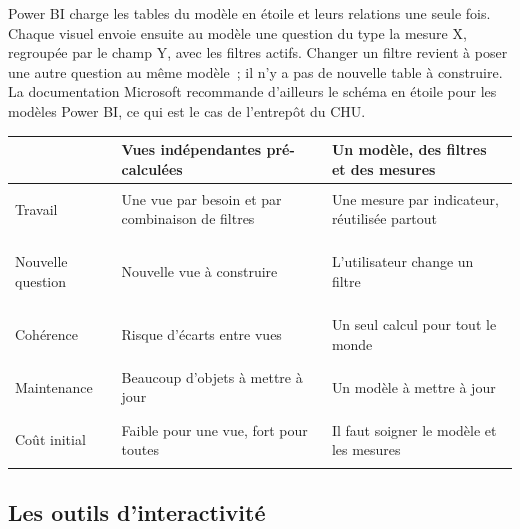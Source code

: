 \noindent Power BI charge les tables du modèle en étoile et leurs relations une seule fois. Chaque visuel envoie ensuite au modèle une question du type \og la mesure X, regroupée par le champ Y, avec les filtres actifs\fg{}. Changer un filtre revient à poser une autre question au même modèle~; il n'y a pas de nouvelle table à construire. La documentation Microsoft recommande d'ailleurs le schéma en étoile pour les modèles Power BI, ce qui est le cas de l'entrepôt du CHU.

\begin{center}
\small
\begin{tabularx}{\textwidth}{>{\bfseries\raggedright\arraybackslash}p{3cm} >{\raggedright\arraybackslash}X >{\raggedright\arraybackslash}X}
\toprule
 & Vues indépendantes pré-calculées & Un modèle, des filtres et des mesures \\
\midrule
Travail & Une vue par besoin et par combinaison de filtres & Une mesure par indicateur, réutilisée partout \\
Nouvelle question & Nouvelle vue à construire & L'utilisateur change un filtre \\
Cohérence & Risque d'écarts entre vues & Un seul calcul pour tout le monde \\
Maintenance & Beaucoup d'objets à mettre à jour & Un modèle à mettre à jour \\
Coût initial & Faible pour une vue, fort pour toutes & Il faut soigner le modèle et les mesures \\
\bottomrule
\end{tabularx}
\end{center}

\subsection{Les outils d'interactivité}

